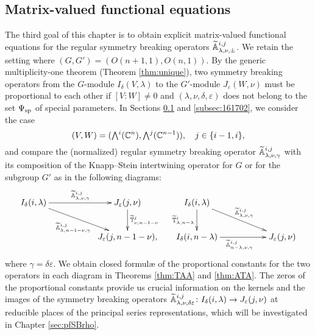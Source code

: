 \subsection{Matrix-valued functional equations}
\label{subsec:FI}
The third goal of this chapter 
 is to obtain explicit matrix-valued functional equations
 for the regular symmetry breaking operators
 ${\widetilde{\mathbb{A}}}_{{\lambda},{\nu},{\pm}}^{{i,j}}$.  
We retain the setting 
 where $(G,G')=(O(n+1,1),O(n,1))$.  
By the 
generic multiplicity-one theorem
 (Theorem \ref{thm:unique}),
 two symmetry breaking operators from 
 the $G$-module $I_{\delta}(V,\lambda)$
 to the $G'$-module $J_{\varepsilon}(W,\nu)$
 must be proportional to each other
 if $[V:W]\ne0$ and $(\lambda,\nu,\delta,\varepsilon)$ does not belong 
 to the set $\Psi_{{\operatorname{sp}}}$
 of special parameters.  
In Sections \ref{subsec:FI} and \ref{subsec:161702},
 we consider the case 
\[
    (V,W)=
    (\Exterior^i({\mathbb{C}}^n), \Exterior^j({\mathbb{C}}^{n-1})),
\quad
    j \in \{i-1,i\}, 
\]
 and compare the (normalized) regular symmetry breaking operator
 ${\widetilde{\mathbb{A}}}_{{\lambda},{\nu},{\gamma}}^{{i,j}}$
 with its composition of the Knapp--Stein intertwining operator
 for $G$ or for the subgroup $G'$
 as in the following diagrams:
\begin{eqnarray*}
\xymatrix{
I_{\delta}(i,\lambda)\ar[rr]^{\Atbb \lambda \nu \gamma {i,j}}
\ar[drr]_{\Atbb \lambda{n-1-\nu}\gamma{i,j}}
&& J_{\varepsilon}(j,\nu)\ar[d]^{\Ttbb \nu {n-1-\nu}j}
\\
&&J_{\varepsilon}(j,n-1-\nu),
}
&&
\xymatrix{
I_{\delta}(i,\lambda) \ar[d]_{\Ttbb \lambda {n-\lambda}i}
\ar[drr]^{\Atbb \lambda \nu \gamma {i,j}}
&&
\\
I_{\delta}(i,n-\lambda)\ar[rr]_{\Atbb {n-\lambda}\nu\gamma{i,j}}
&&J_{\varepsilon}(j,\nu)
}
\end{eqnarray*}
where $\gamma = \delta \varepsilon$.  
We obtain closed formul{\ae}
 of the proportional constants 
 for the two operators in each diagram
 in Theorems \ref{thm:TAA} and \ref{thm:ATA}.  
The zeros of the proportional constants provide us 
 crucial information
 on the kernels and the images of the symmetry breaking operators
 ${\widetilde{\mathbb{A}}}_{{\lambda},{\nu},{\delta \varepsilon}}^{{i,j}} \colon
 I_{\delta}(i,\lambda) \to J_{\varepsilon}(j,\nu)$
 at reducible places
 of the principal series representations, 
 which will be investigated 
 in Chapter \ref{sec:pfSBrho}.  



